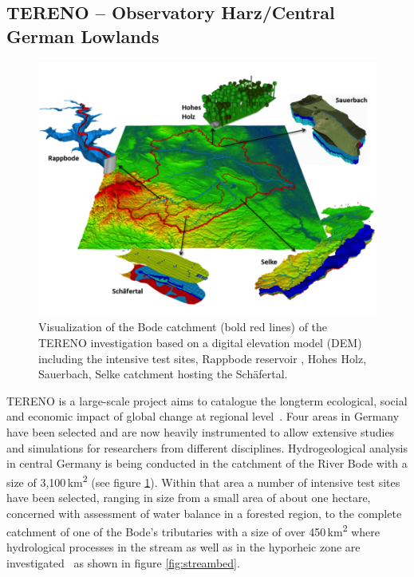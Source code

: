 \documentclass[twocolumn]{svjour3}          %
\begin{document}
\subsection{TERENO -- Observatory Harz/Central German Lowlands}\label{tereno-bode}

\begin{figure}[htb]
  \includegraphics[width=\linewidth]{images/tereno.png}
\caption{Visualization of the Bode catchment (bold red lines) of the TERENO investigation based on a digital elevation model (DEM) including the intensive test sites, Rappbode reservoir \cite{rinke:ees}, Hohes Holz, Sauerbach, Selke catchment hosting the Sch\"afertal.}
\label{fig:tereno}
\end{figure}

TERENO is a large-scale project aims to catalogue the longterm ecological, social and economic impact of global change at regional level~\cite{zacharias:tereno}. Four areas in Germany have been selected and are now heavily instrumented to allow extensive studies and simulations for researchers from different disciplines. Hydrogeological analysis in central Germany is being conducted in the catchment of the River Bode with a size of 3,100\,km\textsuperscript{2} (see figure \ref{fig:tereno}). Within that area a number of intensive test sites have been selected, ranging in size from a small area of about one hectare, concerned with assessment of water balance in a forested region, to the complete catchment of one of the Bode's tributaries with a size of over 450\,km\textsuperscript{2} where hydrological processes in the stream as well as in the hyporheic zone are investigated~\cite{schmidt:selke, trauth:flow} as shown in figure \ref{fig:streambed}.
\end{document}
